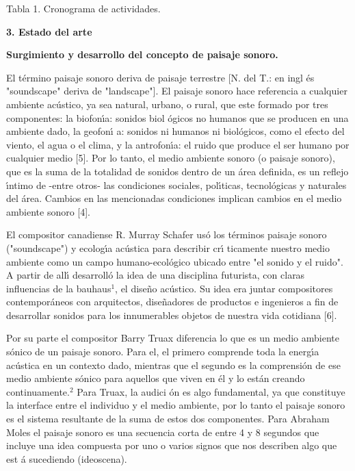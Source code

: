 Tabla 1. Cronograma de actividades.

\textbf{3. Estado del arte}

\textbf{ Surgimiento y desarrollo del concepto de paisaje sonoro.}

El t\'{e}rmino paisaje sonoro deriva de paisaje terrestre [N. del T.: en ingl%
\'{e}s "soundscape" deriva de "landscape"]. El paisaje sonoro hace
referencia a cualquier ambiente ac\'{u}stico, ya sea natural, urbano, o
rural, que este formado por tres componentes: la biofon\'{\i}a: sonidos biol%
\'{o}gicos no humanos que se producen en una ambiente dado, la geofon\'{\i}%
a: sonidos ni humanos ni biol\'{o}gicos, como el efecto del viento, el agua
o el clima, y la antrofon\'{\i}a: el ruido que produce el ser humano por
cualquier medio [5]. Por lo tanto, el medio ambiente sonoro (o paisaje
sonoro), que es la suma de la totalidad de sonidos dentro de un \'{a}rea
definida, es un reflejo \'{\i}ntimo de -entre otros- las condiciones
sociales, pol\'{\i}ticas, tecnol\'{o}gicas y naturales del \'{a}rea. Cambios
en las mencionadas condiciones implican cambios en el medio ambiente sonoro
[4].

El compositor canadiense R. Murray Schafer us\'{o} los t\'{e}rminos paisaje
sonoro ("soundscape") y ecolog\'{\i}a ac\'{u}stica para describir cr\'{\i}%
ticamente nuestro medio ambiente como un campo humano-ecol\'{o}gico ubicado
entre "el sonido y el ruido". A partir de all\'{\i} desarroll\'{o} la idea
de una disciplina futurista, con claras influencias de la bauhaus$^{1}$, el
dise\~{n}o ac\'{u}stico. Su idea era juntar compositores contempor\'{a}neos
con arquitectos, dise\~{n}adores de productos e ingenieros a fin de
desarrollar sonidos para los innumerables objetos de nuestra vida cotidiana
[6].

Por su parte el compositor Barry Truax diferencia lo que es un medio
ambiente s\'{o}nico de un paisaje sonoro. Para el, el primero comprende toda
la energ\'{\i}a ac\'{u}stica en un contexto dado, mientras que el segundo es
la comprensi\'{o}n de ese medio ambiente s\'{o}nico para aquellos que viven
en \'{e}l y lo est\'{a}n creando continuamente.$^{2}$ Para Truax, la audici%
\'{o}n es algo fundamental, ya que constituye la interface entre el
individuo y el medio ambiente, por lo tanto el paisaje sonoro es el sistema
resultante de la suma de estos dos componentes. Para Abraham Moles el
paisaje sonoro es una secuencia corta de entre 4 y 8 segundos que incluye
una idea compuesta por uno o varios signos que nos describen algo que est%
\'{a} sucediendo (ideoscena).

